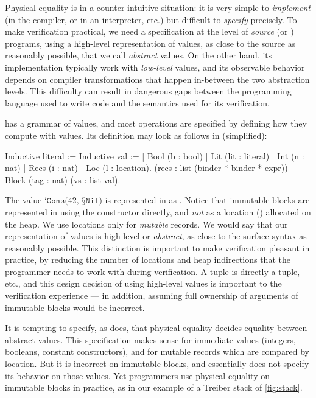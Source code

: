 Physical equality is in a counter-intuitive situation: it is very simple to \emph{implement} (in the \OCaml compiler, or in an interpreter, etc.) but difficult to \emph{specify} precisely. To make verification practical, we need a specification at the level of \emph{source} \OCaml (or \Zoo) programs, using a high-level representation of values, as close to the source as reasonably possible, that we call \emph{abstract} values. On the other hand, its implementation typically work with \emph{low-level} values, and its observable behavior depends on compiler transformations that happen in-between the two abstraction levels.
This difficulty can result in dangerous gaps between the programming language used to write code and the semantics used for its verification.

\ZooLang has a grammar of values, and most operations are specified by defining how they compute with \ZooLang values. Its definition may look as follows in \Rocq (simplified):
\begin{coqcode}
Inductive literal :=            Inductive val :=
 | Bool (b : bool)                | Lit (lit : literal)
 | Int (n : nat)                  | Recs (i : nat)
 | Loc (l : location).                   (recs : list (binder * binder * expr))
                                  | Block (tag : nat) (vs : list val).
\end{coqcode}

The value $\texttt{‘Cons(} 42 \texttt{, §Nil)}$ is represented in \Rocq as . Notice that immutable blocks are represented in \Rocq using the  constructor directly, and \emph{not} as a location () allocated on the heap. We use locations only for \emph{mutable} records. We would say that our representation of \ZooLang values is high-level or \emph{abstract}, as close to the surface syntax as reasonably possible. This distinction is important to make verification pleasant in practice, by reducing the number of locations and heap indirections that the programmer needs to work with during verification. A \ZooLang tuple is directly a tuple, etc., and this design decision of using high-level values is important to the verification experience --- in addition, assuming full ownership of arguments of immutable blocks would be incorrect.

It is tempting to specify, as \HeapLang does, that physical equality decides equality between abstract values. This specification makes sense for immediate values (integers, booleans, constant constructors), and for mutable records which are compared by location. But it is incorrect on immutable blocks, and \HeapLang essentially does not specify its behavior on those values. Yet programmers use physical equality on immutable blocks in practice, as in our example of a Treiber stack of \cref{fig:stack}.

